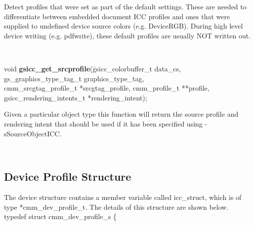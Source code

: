 \documentclass[12pt,notitlepage]{article}
\begin{document}
\begin{minipage}[h]{6.0in}
Detect profiles that were set as part of the default settings.  These are needed to differentiate between embedded document ICC profiles and ones that were supplied to undefined device source colors (e.g. DeviceRGB).  During high level device writing (e.g. pdfwrite), these default profiles are usually NOT written out.
\end{minipage}\\

\begin{tabbing}
\noindent void {\bf gsicc\_get\_srcprofile}(\=gsicc\_colorbuffer\_t data\_cs,
                     gs\_graphics\_type\_tag\_t graphics\_type\_tag,\\
                     \>cmm\_srcgtag\_profile\_t *srcgtag\_profile,
                     cmm\_profile\_t **profile,\\
                     \>gsicc\_rendering\_intents\_t *rendering\_intent);\\
\end{tabbing}

\begin{minipage}[h]{6.0in}
Given a particular object type this function will return the source profile and rendering intent that should be used
if it has been specified using -sSourceObjectICC.
\end{minipage}\\

\singlespace

\subsection{Device Profile Structure}

The device structure contains a member variable called icc\_struct, which is of type *cmm\_dev\_profile\_t.  The details
of this structure are shown below.\\

\noindent typedef struct cmm\_dev\_profile\_s \{
\end{document}
